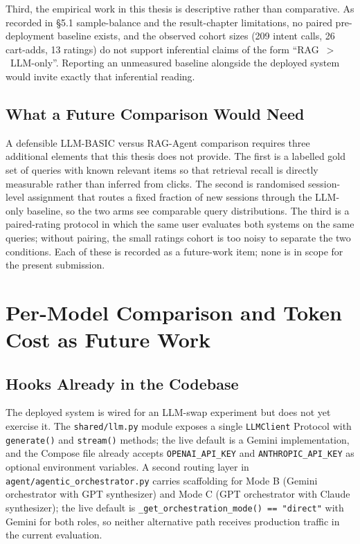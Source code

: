 Third, the empirical work in this thesis is descriptive rather than comparative. As recorded in §5.1 sample-balance and the result-chapter limitations, no paired pre-deployment baseline exists, and the observed cohort sizes (209 intent calls, 26 cart-adds, 13 ratings) do not support inferential claims of the form ``RAG~$>$~LLM-only''. Reporting an unmeasured baseline alongside the deployed system would invite exactly that inferential reading.

\subsection{What a Future Comparison Would Need}

A defensible LLM-BASIC versus RAG-Agent comparison requires three additional elements that this thesis does not provide. The first is a labelled gold set of queries with known relevant items so that retrieval recall is directly measurable rather than inferred from clicks. The second is randomised session-level assignment that routes a fixed fraction of new sessions through the LLM-only baseline, so the two arms see comparable query distributions. The third is a paired-rating protocol in which the same user evaluates both systems on the same queries; without pairing, the small ratings cohort is too noisy to separate the two conditions. Each of these is recorded as a future-work item; none is in scope for the present submission.

\section{Per-Model Comparison and Token Cost as Future Work}
\label{sec:disc_per_model}

\subsection{Hooks Already in the Codebase}

The deployed system is wired for an LLM-swap experiment but does not yet exercise it. The \texttt{shared/llm.py} module exposes a single \texttt{LLMClient} Protocol with \texttt{generate()} and \texttt{stream()} methods; the live default is a Gemini implementation, and the Compose file already accepts \texttt{OPENAI\_API\_KEY} and \texttt{ANTHROPIC\_API\_KEY} as optional environment variables. A second routing layer in \texttt{agent/agentic\_orchestrator.py} carries scaffolding for Mode B (Gemini orchestrator with GPT synthesizer) and Mode C (GPT orchestrator with Claude synthesizer); the live default is \texttt{\_get\_orchestration\_mode()~==~"direct"} with Gemini for both roles, so neither alternative path receives production traffic in the current evaluation.

